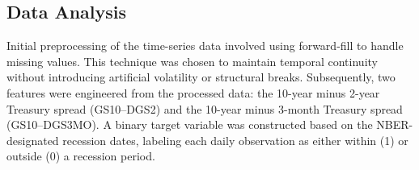 \subsection{Data Analysis}

Initial preprocessing of the time-series data involved using forward-fill to handle missing values. This technique was chosen to maintain temporal continuity without introducing artificial volatility or structural breaks.%
Subsequently, two features were engineered from the processed data: the 10-year minus 2-year Treasury spread (GS10--DGS2) and the 10-year minus 3-month Treasury spread (GS10--DGS3MO). %
A binary target variable was constructed based on the NBER-designated recession dates, labeling each daily observation as either within (1) or outside (0) a recession period. 


